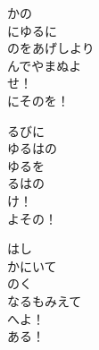 \documentclass[10pt,b5j]{tarticle} %
\begin{document}
\vspace{1.5em} %
\newcommand{\linespace}{0.5em} %
\newcommand{\blocksize}{0.5\hsize} %
\begin{enumerate} %
    \begin{minipage}[c]{\blocksize}
    
        \vspace{\linespace}
        \item
        かの\\
        にゆるに\\
        のをあげしより\\
        んでやまぬよ\\
        せ！\\
        にそのを！
        
        \vspace{\linespace}
        \item
        るびに\\
        ゆるはの\\
        ゆるを\\
        るはの\\
        け！\\
        よその！
        
        \vspace{\linespace}
        \item
        はし\\
        かにいて\\
        のく\\
        なるもみえて\\
        へよ！\\
        ある！
    
    \end{minipage}
\end{enumerate} %
\end{document}
